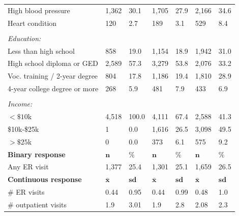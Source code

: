 \documentclass[hidelinks,12pt]{article}
\begin{document}
\begin{appendices}
\begin{singlespace}
\begin{longtable}{lllllll}
		\hspace{3mm}High blood pressure & 1,362 & 30.1 & 1,705 & 27.9 & 2,166 & 34.6  \\ 
		
		\hspace{3mm}Heart condition & 120 & 2.7 & 189 & 3.1 & 529 & 8.4 \\ 
		&  & & &  &  & \\ 
		\textit{Education:} &  & & &  &  & \\  
		\hspace{3mm}Less than high school  & 858 & 19.0 & 1,154 & 18.9 & 1,942 & 31.0  \\ 
		
		\hspace{3mm}High school diploma or GED & 2,589 & 57.3 & 3,279 & 53.8 & 2,076 & 33.2   \\ 
		
		\hspace{3mm}Voc. training / 2-year degree & 804 & 17.8 & 1,186 & 19.4 & 1,810 & 28.9  \\ 
		
		\hspace{3mm}4-year college degree or more & 268 & 5.9 & 481 & 7.9 & 433 & 6.9  \\ 
		&  & & &  &  & \\ 
		\textit{Income:} &  & & &  &  & \\ 
		\hspace{3mm} $<\$10$k & 4,518 & 100.0 & 4,111 & 67.4 & 2,588 & 41.3  \\
		
		\hspace{3mm} \$10k-\$25k & 1 & 0.0 & 1,616 & 26.5 & 3,098 & 49.5 \\
		
		\hspace{3mm} $>\$25$k & 0 & 0.0 & 373 & 6.1 & 575 & 9.2   \\
		\hline
		\hline
		\textbf{Binary response} &  $\mathbf{n}$ & $\mathbf{\%}$ & $\mathbf{n}$ & $\mathbf{\%}$ & $\mathbf{n}$ & $\mathbf{\%}$ \\ 
		\hspace{3mm}Any ER visit &  1,377 & 25.4 & 1,301 & 25.1 & 1,659 & 26.5  \\  
		\hline
		\textbf{Continuous response} &  $\mathbf{\bar{x}}$ & $\mathbf{sd}$& $\mathbf{\bar{x}}$ & $\mathbf{sd}$ & $\mathbf{\bar{x}}$ & $\mathbf{sd}$ \\  
		\hspace{3mm}$\#$ ER visits &  0.44 & 0.95 & 0.44 & 0.99 & 0.48 & 1.0  \\  
		\hspace{3mm}$\#$ outpatient visits & 1.9 & 3.01 & 1.9 & 2.8 & 2.08 & 2.3 \\
		\hline
		\hline
	\end{longtable}
\noindent
\end{singlespace}
\restoregeometry


\end{appendices}
\end{document}
